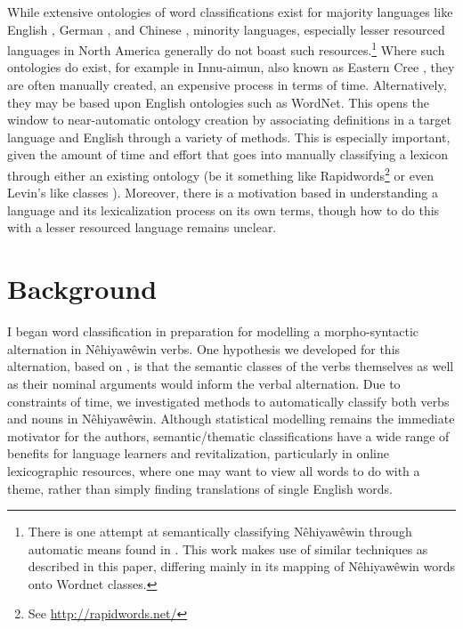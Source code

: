 While extensive ontologies of word classifications exist for majority languages like English \citep{miller1998wordnet}, German \citep{hamp1997germanet}, and Chinese \citep{wang2013building}, minority languages, especially lesser resourced languages in North America generally do not boast such resources.\footnote{There is one attempt at semantically classifying Nêhiyawêwin through automatic means found in \citet{dacanay2021}. This work makes use of similar techniques as described in this paper, differing mainly in its mapping of Nêhiyawêwin words onto Wordnet classes.} Where such ontologies do exist, for example in Innu-aimun, also known as Eastern Cree \citep{visitor2013eastern}, they are often manually created, an expensive process in terms of time. Alternatively, they may be based upon English ontologies such as WordNet. This opens the window to near-automatic ontology creation by associating definitions in a target language and English through a variety of methods. This is especially important, given the amount of time and effort that goes into manually classifying a lexicon through either an existing ontology (be it something like Rapidwords\footnote{See \url{http://rapidwords.net/}} or even Levin's like classes \citep{levin1993english}). Moreover, there is a motivation based in understanding a language and its lexicalization process on its own terms, though how to do this with a lesser resourced language remains unclear.

\section{Background}
I began word classification in preparation for modelling a morpho-syntactic alternation in Nêhiyawêwin verbs. One hypothesis we developed for this alternation, based on \citet{arppe2008univariate}, is that the semantic classes of the verbs themselves as well as their nominal arguments would inform the verbal alternation. Due to constraints of time, we investigated methods to automatically classify both verbs and nouns in Nêhiyawêwin. Although statistical modelling remains the immediate motivator for the authors, semantic/thematic classifications have a wide range of benefits for language learners and revitalization, particularly in online lexicographic resources, where one may want to view all words to do with a theme, rather than simply finding translations of single English words.

